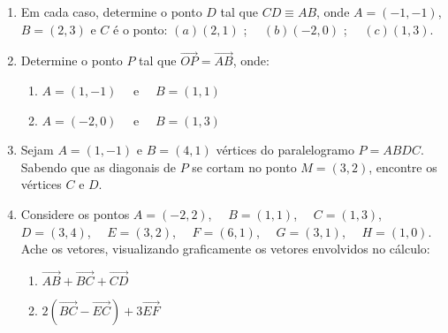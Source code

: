 \documentclass[12pt]{article}
\begin{document}
\begin{enumerate}
  \item Em cada caso, determine o ponto $D$ tal que $CD \equiv AB$, onde $A=(-1,-1)$, $B=(2,3)$ e $C$ \'{e} o ponto:
        $(a)(2,1)$ ; \ \    $(b)(-2,0)$ ; \ \ $(c)(1,3)$.
  \item Determine o ponto $P$ tal que $\overrightarrow{OP} = \overrightarrow{AB}$, onde:
        \begin{enumerate}
          \item $A=(1,-1)$ \ \ e \ \ $B=(1,1)$
          \item $A=(-2,0)$ \ \  e \ \  $B=(1,3)$
        \end{enumerate}
  \item Sejam $A=(1,-1)$  e  $B=(4,1)$  v\'{e}rtices do paralelogramo  $P = ABDC$. Sabendo que as diagonais de $P$ se cortam no ponto $M = (3,2)$, encontre os v\'{e}rtices $C$  e  $D$.
  \item Considere os pontos $A = (-2,2)$, \ \ $B = (1,1)$, \ \ $C = (1,3)$, \ \ $D = (3,4)$, \ \ $E = (3,2)$, \ \ $F = (6,1)$, \ \ $G = (3,1)$, \ \ $H = (1,0)$. Ache os vetores, visualizando graficamente os vetores envolvidos no c\'{a}lculo:
        \begin{enumerate}
          \item $\overrightarrow{AB}+\overrightarrow{BC}+\overrightarrow{CD}$
          \item $2(\overrightarrow{BC} - \overrightarrow{EC}) + 3 \overrightarrow{EF}$
        \end{enumerate}


\end{enumerate}
\end{document}
